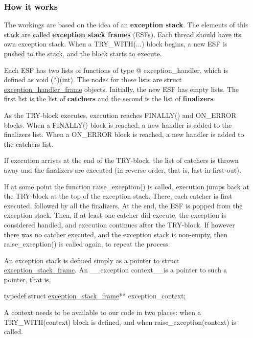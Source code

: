 \subsubsection*{How it works}

The workings are based on the idea of an {\bfseries exception stack}. The elements of this stack are called {\bfseries exception stack frames} (E\-S\-Fs). Each thread should have its own exception stack. When a T\-R\-Y\-\_\-\-W\-I\-T\-H(...) block begins, a new E\-S\-F is pushed to the stack, and the block starts to execute.

Each E\-S\-F has two lists of functions of type @ exception\-\_\-handler, which is defined as {\ttfamily void ($\ast$)(int)}. The nodes for these lists are {\ttfamily struct \hyperlink{structexception__handler__frame}{exception\-\_\-handler\-\_\-frame}} objects. Initially, the new E\-S\-F has empty lists. The first list is the list of {\bfseries catchers} and the second is the list of {\bfseries finalizers}.

As the T\-R\-Y-\/block executes, execution reaches {\ttfamily F\-I\-N\-A\-L\-L\-Y()} and {\ttfamily O\-N\-\_\-\-E\-R\-R\-O\-R} blocks. When a {\ttfamily F\-I\-N\-A\-L\-L\-Y()} block is reached, a new handler is added to the finalizers list. When a {\ttfamily O\-N\-\_\-\-E\-R\-R\-O\-R} block is reached, a new handler is added to the catchers list.

If execution arrives at the end of the T\-R\-Y-\/block, the list of catchers is thrown away and the finalizers are executed (in reverse order, that is, last-\/in-\/first-\/out).

If at some point the function {\ttfamily raise\-\_\-exception()} is called, execution jumps back at the T\-R\-Y-\/block at the top of the exception stack. There, each catcher is first executed, followed by all the finalizers. At the end, the E\-S\-F is popped from the exception stack. Then, if at least one catcher did execute, the exception is considered handled, and execution continues after the T\-R\-Y-\/block. If however there was no catcher executed, and the exception stack is non-\/empty, then {\ttfamily raise\-\_\-exception()} is called again, to repeat the process.

An exception stack is defined simply as a pointer to {\ttfamily struct \hyperlink{structexception__stack__frame}{exception\-\_\-stack\-\_\-frame}}. An \-\_\-\-\_\-exception context\-\_\-\-\_\-is a pointer to such a pointer, that is, 
\begin{DoxyCode}
\textcolor{keyword}{typedef} \textcolor{keyword}{struct }\hyperlink{structexception__stack__frame}{exception\_stack\_frame}** exception\_context;
\end{DoxyCode}
 A context needs to be available to our code in two places\-: when a {\ttfamily T\-R\-Y\-\_\-\-W\-I\-T\-H(context)} block is defined, and when {\ttfamily raise\-\_\-exception(context)} is called.

